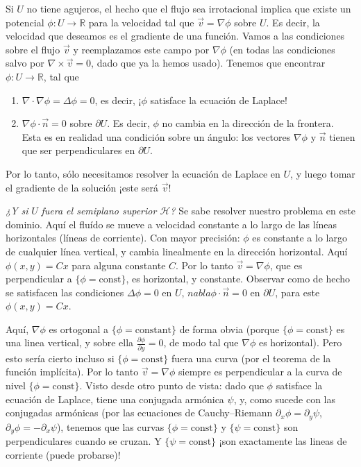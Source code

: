 \documentclass{article}
\newcommand{\realNumbers}{\mathbb{R}}
\newcommand{\upperHalfPlane}{\mathcal{H}}
\theoremstyle{remark}
\begin{document}
  Si \(U\) no tiene agujeros, el hecho que el flujo sea irrotacional implica que existe un potencial \(\phi : U \rightarrow \realNumbers\) para la velocidad tal que \(\vec{v} = \nabla \phi\) sobre \(U\).
  Es decir, la velocidad que deseamos es el gradiente de una función.
  Vamos a las condiciones sobre el flujo \(\vec{v}\) y reemplazamos este campo por \(\nabla \phi\) (en todas las condiciones salvo por \(\nabla \times \vec{v} = 0\), dado que ya la hemos usado).
  Tenemos que encontrar \(\phi : U \rightarrow \realNumbers\), tal que
  \begin{enumerate}
    \item \(\nabla \cdot \nabla \phi = \Delta \phi = 0\), es decir, ¡\(\phi\) satisface la ecuación de Laplace!
    \item \(\nabla \phi \cdot \vec{n} = 0\) sobre \(\partial U\).
    Es decir, \(\phi\) no cambia en la dirección de la frontera.
    Esta es en realidad una condición sobre un ángulo: los vectores \(\nabla \phi\) y \(\vec{n}\) tienen que ser perpendiculares en \(\partial U\).
  \end{enumerate}
  Por lo tanto, sólo necesitamos resolver la ecuación de Laplace en \(U\), y luego tomar el gradiente de la solución
  ¡este será \(\vec{v}\)!

  \emph{¿Y si} \(U\) \emph{fuera el semiplano superior \(\upperHalfPlane\)?}
  Se sabe resolver nuestro problema en este dominio.
  Aquí el fluído se mueve a velocidad constante a lo largo de las líneas horizontales (líneas de corriente).
  Con mayor precisión:
  \(\phi\) es constante a lo largo de cualquier línea vertical, y cambia linealmente en la dirección horizontal.
  Aquí \(\phi(x, y) = C x\) para alguna constante \(C\).
  Por lo tanto \(\vec{v} = \nabla \phi\), que es perpendicular a \(\{\phi = \text{const}\}\), es horizontal, y constante.
  Observar como de hecho se satisfacen las condiciones \(\Delta \phi = 0\) en \(U\), \(nabla \phi \cdot \vec{n} = 0\) en \(\partial U\), para este \(\phi(x, y) = C x\).

  Aquí, \(\nabla \phi\) es ortogonal a \(\{\phi = \text{constant}\}\) de forma obvia
  (porque \(\{\phi = \text{const}\}\) es una linea vertical, y sobre ella \(\frac{\partial \phi}{\partial y} = 0\), de modo tal que \(\nabla \phi\) es horizontal).
  Pero esto sería cierto incluso si \(\{\phi = \text{const}\}\) fuera una curva (por el teorema de la función implícita).
  Por lo tanto \(\vec{v} = \nabla \phi\) siempre es perpendicular a la curva de nivel \(\{\phi = \text{const}\}\).
  Visto desde otro punto de vista: dado que \(\phi\) satisface la ecuación de Laplace, tiene una conjugada armónica \(\psi\), y, como sucede con las conjugadas armónicas (por las ecuaciones de Cauchy--Riemann \(\partial_x \phi = \partial_y \psi\), \(\partial_y \phi = - \partial_x \psi\)), tenemos que las curvas \(\{\phi = \text{const}\}\) y \(\{\psi = \text{const}\}\) son perpendiculares cuando se cruzan.
  Y \(\{\psi = \text{const}\}\) ¡son exactamente las lineas de corriente (puede probarse)!
\end{document}
